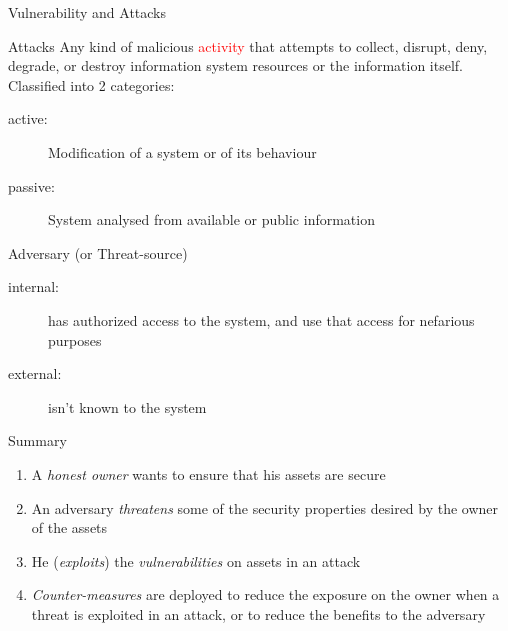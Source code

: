 \begin{reveals}
\begin{frame}[c]{Vulnerability and Attacks}
  \begin{block}{Attacks}
    Any kind of malicious \textcolor{red}{activity} that attempts to
    collect, disrupt, deny, degrade, or destroy information system
    resources or the information itself.  Classified into 2 categories:
    \begin{description}
    \item[active:] Modification of a system or of its behaviour
    \item[passive:] System analysed from available or public
      information
    \end{description}
  \end{block}
  \vfill
  \begin{block}{Adversary (or Threat-source)}
    \begin{description}
    \item[internal:] has authorized access to the system, and use that
      access for nefarious purposes
    \item[external:] isn't known to the system
    \end{description}
  \end{block}

\end{frame}
\begin{frame}[c]{Summary}
  
  \begin{enumerate}
  \item A \emph{honest owner} wants to ensure that his assets are secure
  \item An adversary \emph{threatens} some of the security properties
    desired by the owner of the assets
  \item He (\emph{exploits}) the \emph{vulnerabilities} on assets in an attack
  \item \emph{Counter-measures} are deployed to reduce the exposure on
    the owner when a threat is exploited in an attack, or to reduce
    the benefits to the adversary
  \end{enumerate}
\end{frame}




\end{reveals}
